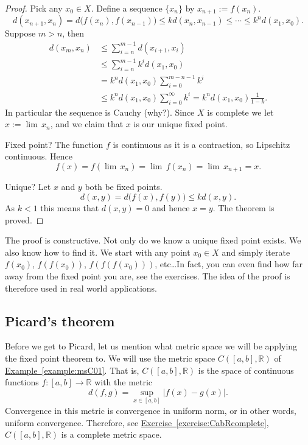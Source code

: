 \documentclass[12pt]{book}
\newcommand{\abs}[1]{\left\lvert {#1} \right\rvert}
\newcommand{\R}{{\mathbb{R}}}
\theoremstyle{plain}
\theoremstyle{remark}
\theoremstyle{definition}
\theoremstyle{exercise}
\theoremstyle{example}
\newcommand{\exerciseref}[1]{\hyperref[#1]{Exercise~\ref*{#1}}}
\newcommand{\exampleref}[1]{\hyperref[#1]{Example~\ref*{#1}}}
\begin{document}
\begin{proof}
Pick any $x_0 \in X$.
Define a sequence $\{ x_n \}$ by $x_{n+1} := f(x_n)$.
\begin{equation*}
d(x_{n+1},x_n) = d\bigl(f(x_n),f(x_{n-1})\bigr)
\leq k d(x_n,x_{n-1})
\leq \cdots
\leq k^n d(x_1,x_0) .
\end{equation*}
Suppose $m > n$, then
\begin{equation*}
\begin{split}
d(x_m,x_n)
& \leq \sum_{i=n}^{m-1} d(x_{i+1},x_i) \\
& \leq \sum_{i=n}^{m-1} k^i d(x_1,x_0) \\
& = k^n d(x_1,x_0) \sum_{i=0}^{m-n-1} k^i \\
& \leq k^n d(x_1,x_0) \sum_{i=0}^{\infty} k^i
= k^n d(x_1,x_0) \frac{1}{1-k} .
\end{split}
\end{equation*}
In particular the sequence is Cauchy (why?).  Since $X$ is complete
we let $x := \lim\, x_n$, and we claim that $x$
is our unique fixed point.

Fixed point?  The function $f$ is continuous as it is a contraction, so
Lipschitz continuous.
Hence
\begin{equation*}
f(x) = f( \lim \, x_n) = \lim\, f(x_n) = \lim\, x_{n+1} = x .
\end{equation*}

Unique?  Let $x$ and $y$ both be fixed points.
\begin{equation*}
d(x,y) = d\bigl(f(x),f(y)\bigr) \leq k d(x,y) .
\end{equation*}
As $k < 1$ this means that $d(x,y) = 0$ and hence $x=y$.  The theorem is
proved.
\end{proof}

The proof is constructive.  Not only do we know 
a unique fixed point exists.  We also know how to find it.  We start with
any point $x_0 \in X$ and simply iterate $f(x_0)$,
$f(f(x_0))$,
$f(f(f(x_0)))$, etc\ldots  In fact, you can even find how far away
from the fixed point you are, see the exercises.  The idea of the proof is
therefore used in real world applications.

\subsection{Picard's theorem}

Before we get to Picard, let us mention what metric space we will be
applying the fixed point theorem to.  We will use the metric space
$C([a,b],\R)$ of \exampleref{example:msC01}.  That is, $C([a,b],\R)$
is the space of continuous functions $f \colon [a,b] \to \R$ with the metric
\begin{equation*}
d(f,g) = \sup_{x \in [a,b]} \abs{f(x)-g(x)} .
\end{equation*}
Convergence in this metric is convergence in uniform norm, or in other
words, uniform convergence.  Therefore, see
\exerciseref{exercise:CabRcomplete}, $C([a,b],\R)$ is a complete metric space.
\end{document}
